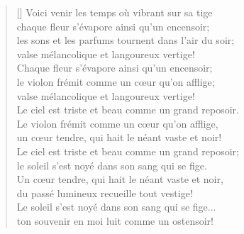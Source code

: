 \documentclass[14pt]{article}
\begin{document}

\Huge
\tangerine

\vspace*{-2\baselineskip}

\settowidth{\versewidth}{Les sons et les parfums tournent dans l'air du soir;}

\bigskip

\begin{center}
  \begin{verse}[\versewidth]
    Voici venir les temps où vibrant sur sa tige \\
    chaque fleur s'évapore ainsi qu'un encensoir; \\
    les sons et les parfums tournent dans l'air du soir; \\
    valse mélancolique et langoureux vertige!\\[1\baselineskip]

    Chaque fleur s'évapore ainsi qu'un encensoir; \\
    le violon frémit comme un cœur qu'on afflige; \\
    valse mélancolique et langoureux vertige! \\
    Le ciel est triste et beau comme un grand reposoir.\\[1\baselineskip]

    Le violon frémit comme un cœur qu'on afflige, \\
    un cœur tendre, qui hait le néant vaste et noir! \\
    Le ciel est triste et beau comme un grand reposoir; \\
    le soleil s'est noyé dans son sang qui se fige.\\[1\baselineskip]

    Un cœur tendre, qui hait le néant vaste et noir, \\
    du passé lumineux recueille tout vestige! \\
    Le soleil s'est noyé dans son sang qui se fige... \\
    ton souvenir en moi luit comme un ostensoir!
  \end{verse}
\end{center}
\end{document}
